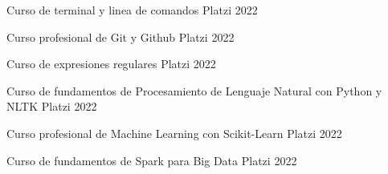 

\begin{cvhonors}

  \cvhonor
    {Curso de terminal y linea de comandos} %
    {} %
    {Platzi} %
    {2022} %

  \cvhonor
    {Curso profesional de Git y Github} %
    {} %
    {Platzi} %
    {2022} %


  \cvhonor
    {Curso de expresiones regulares} %
    {} %
    {Platzi} %
    {2022} %


  \cvhonor
    {Curso de fundamentos de Procesamiento de Lenguaje Natural con Python y NLTK} %
    {} %
    {Platzi} %
    {2022} %

    
  \cvhonor
    {Curso profesional de Machine Learning con Scikit-Learn} %
    {} %
    {Platzi} %
    {2022} %


  \cvhonor
    {Curso de fundamentos de Spark para Big Data} %
    {} %
    {Platzi} %
    {2022} %


\end{cvhonors}
